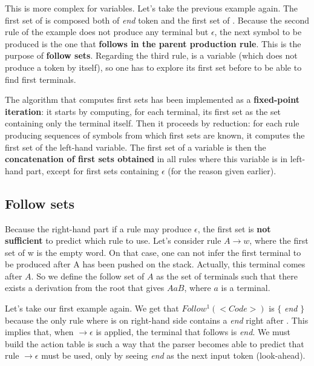 This is more complex for variables. Let's take the previous example again. The first set of 
is composed both of \textit{end} token and the first set of . Because the second rule of the example
does not produce any terminal but $\epsilon$, the next symbol to be produced is the one that \textbf{follows in the parent production rule}.
This is the purpose of \textbf{follow sets}.
Regarding the third rule,  is a variable (which does not produce a token by itself), so one has to explore its first set
before to be able to find first terminals.

The algorithm that computes first sets has been implemented as a \textbf{fixed-point iteration}: it starts by computing, for each terminal, 
its first set as the set containing only the terminal itself. Then it proceeds by reduction: for each rule producing sequences of symbols
from which first sets are known, it computes the first set of the left-hand variable.
The first set of a variable is then the \textbf{concatenation of first sets obtained} in all rules where this variable is in left-hand part, 
except for first sets containing $\epsilon$ (for the reason given earlier).

\subsection{Follow sets}

Because the right-hand part if a rule may produce $\epsilon$, the first set is \textbf{not sufficient} to predict which rule to use.
Let's consider rule $A \rightarrow w$, where the first set of w is the empty word. On that case, one can not infer the first terminal
to be produced after A has been pushed on the stack. Actually, this terminal comes after $A$. So we define the follow set of $A$ as
the set of terminals such that there exists a derivation from the root that gives $A a B$, where $a$ is a terminal.

Let's take our first example again. We get that $Follow^1(<Code>)$ is $\{$ \textit{end} $\}$ because the only rule where 
is on right-hand side contains a \textit{end} right after . This implies that, when  $\rightarrow \epsilon$
is applied, the terminal that follows is \textit{end}. We must build the action table is such a way that the parser becomes able to predict
that rule  $\rightarrow \epsilon$ must be used, only by seeing \textit{end} as the next input token (look-ahead).


